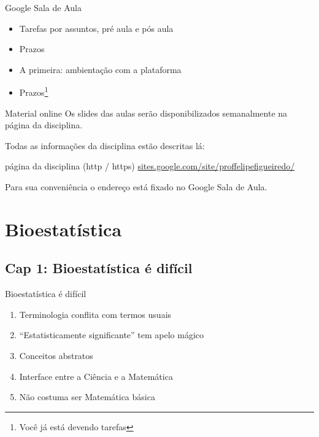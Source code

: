 \documentclass{beamer}
\begin{document}
\begin{frame}{\scriptsize Google Sala de Aula}
  \begin{itemize}
    \footnotesize
  \item Tarefas por assuntos, pré aula e pós aula
  \item Prazos
  \item A primeira: ambientação com a plataforma
  \item Prazos\footnote{Você já está devendo tarefas}
  \end{itemize}
\end{frame}

\begin{frame}{\scriptsize Material online}
  \footnotesize
  Os slides das aulas serão disponibilizados semanalmente na página da disciplina.

  \bigskip
  Todas as informações da disciplina estão descritas lá:
  \begin{block}{página da disciplina (http / https)}
    \footnotesize
    \url{sites.google.com/site/proffelipefigueiredo/}
  \end{block}

  \bigskip
  Para sua conveniência o endereço está fixado no Google Sala de Aula.
\end{frame}

\section{Bioestatística}

\subsection{Cap 1: Bioestatística é difícil}

\begin{frame}{\scriptsize Bioestatística é difícil}
  \begin{enumerate}
    \footnotesize
  \item Terminologia conflita com termos usuais
  \item ``Estatisticamente significante'' tem apelo mágico
  \item Conceitos abstratos
  \item Interface entre a Ciência e a Matemática
  \item Não costuma ser Matemática básica
  \end{enumerate}
\end{frame}
\end{document}
